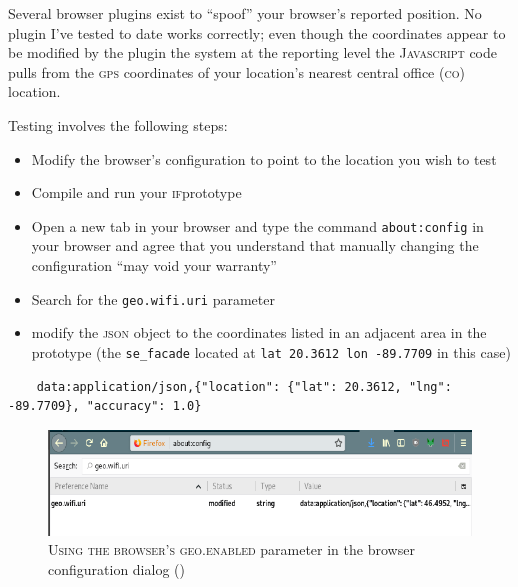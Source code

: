 Several browser plugins exist to ``spoof'' your browser's reported position. No
plugin I've tested to date works correctly; even though the coordinates appear
to be modified by the plugin the system at the reporting level the \textsc{Javascript}
code pulls from the \textsc{gps} coordinates of your location's nearest central
office \textsc{(co)} location.

Testing involves the following steps:
\begin{itemize}[leftmargin=0em]
  \item{Modify the browser's configuration to point to the location you wish to
      test}
  \item{Compile and run your \textsc{if}prototype}
    \end{itemize}
\begin{itemize}[leftmargin=0em]
\item{Open a new tab in your browser and type the command \texttt{\scriptsize{about:config}}
    in your browser and agree that you understand that manually changing the
    configuration ``may void your warranty''}
\item{Search for the \texttt{geo.wifi.uri} parameter}
  \item{modify the \textsc{json} object to the coordinates listed in an
      adjacent area in the prototype (the \texttt{\scriptsize{se\_facade}}
      located at \texttt{\scriptsize{lat 20.3612 lon -89.7709}} in this case)}
\end{itemize}
  \begin{lstlisting}
    data:application/json,{"location": {"lat": 20.3612, "lng": -89.7709}, "accuracy": 1.0}
  \end{lstlisting}
\begin{figure}[h]                                                           
 \includegraphics[width=\linewidth]{./media/images/gps_config.pdf}%
  \scriptsize{\textsc{\\Using the browser's geo.enabled} parameter in the
    browser configuration dialog ()}
  \label{fig:about_config}%
\end{figure}
